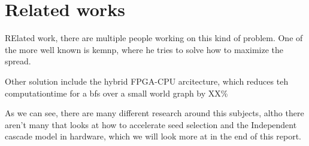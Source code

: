 \chapter{Related works}
RElated work, there are multiple people working on this kind of problem. One of the more well known is kemnp, where he tries to solve how to maximize the spread. 


Other solution include the hybrid FPGA-CPU arcitecture, which reduces teh computationtime for a bfs over a small world graph by XX\%\cite{YamanPOaper} 

As we can see, there are many different research around this subjects, altho there aren't many that looks at how to accelerate seed selection and the Independent cascade model in hardware, which we will look more at in the end of this report.